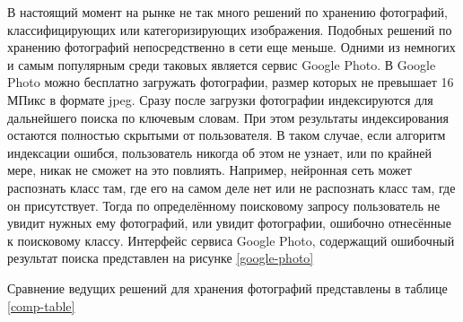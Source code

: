 В настоящий момент на рынке не так много решений по хранению фотографий, классифицирующих или категоризирующих изображения.
Подобных решений по хранению фотографий непосредственно в сети еще меньше.
Одними из немногих и самым популярным среди таковых является сервис Google Photo. 
В Google Photo можно бесплатно загружать фотографии, размер которых не превышает 16 МПикс в формате jpeg. 
Сразу после загрузки фотографии индексируются для дальнейшего поиска по ключевым словам.
При этом результаты индексирования остаются полностью скрытыми от пользователя. 
В таком случае, если алгоритм индексации ошибся, пользователь никогда об этом не узнает, или по крайней мере, никак не сможет на это повлиять. 
Например, нейронная сеть может распознать класс там, где его на самом деле нет или не распознать класс там, где он присутствует.
Тогда по определённому поисковому запросу пользователь не увидит нужных ему фотографий, или увидит фотографии, ошибочно отнесённые к поисковому классу.
Интерфейс сервиса Google Photo, содержащий ошибочный результат поиска представлен на рисунке \ref{google-photo}


Сравнение ведущих решений для хранения фотографий представлены в таблице \ref{comp-table}

